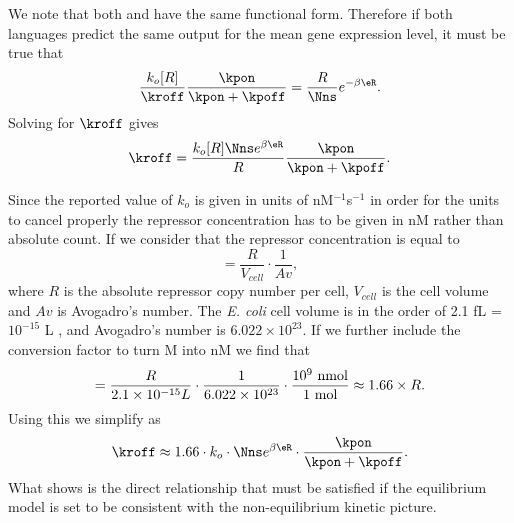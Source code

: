 We note that both  and  have the same
functional form. Therefore if both languages predict the same output for the
mean gene expression level, it must be true that
\begin{equation}
  {k_o [R] \over \kroff}{\kpon \over \kpon + \kpoff} =
  {R \over \Nns} e^{-\beta\eR}.
\end{equation}
Solving for $\kroff$ gives
\begin{equation}
  \kroff = {k_o [R] \Nns e^{\beta\eR} \over R}{\kpon \over \kpon + \kpoff}.
  \label{seq_kroff_complete}
\end{equation}

Since the reported value of $k_o$ is given in units of nM$^{-1}$s$^{-1}$ in
order for the units to cancel properly the repressor concentration has to be
given in nM rather than absolute count. If we consider that the repressor
concentration is equal to
\begin{equation}
[R] = \frac{R}{V_{cell}}\cdot \frac{1}{Av},
\end{equation}
where $R$ is the absolute repressor copy number per cell, $V_{cell}$ is the cell
volume and $Av$ is Avogadro's number. The \textit{E. coli} cell volume is in the
order of 2.1 fL = $10^{-15}$ L , and Avogadro's
number is $6.022 \times 10^{23}$. If we further include the conversion factor to
turn M into nM we find that
\begin{equation}
[R] = {R \over 2.1 \times 10^{-15} L} \cdot {1 \over 6.022 \times 10^{23}}
\cdot {10^9 \text{ nmol} \over 1 \text{ mol}} \approx 1.66 \times R.
\end{equation}
Using this we simplify  as
\begin{equation}
  \kroff \approx 1.66 \cdot k_o \cdot \Nns e^{\beta\eR}
   \cdot {\kpon \over \kpon + \kpoff}.
  \label{seq_kroff}
\end{equation}
What  shows is the direct relationship that must be satisfied if
the equilibrium model is set to be consistent with the non-equilibrium kinetic
picture.
